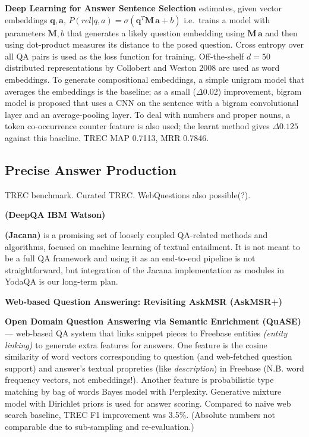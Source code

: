\textbf{Deep Learning for Answer Sentence Selection} \citep{Yu2014Deep}
	estimates, given vector embeddings $\mathbf{q}, \mathbf{a}$,
	$P(rel|q,a) = \sigma(\mathbf{q}^T \mathbf{M}\, \mathbf{a} + b)$
	i.e.\ trains a model with parameters $\mathbf{M}, b$ that
	generates a likely question embedding using $\mathbf{M}\, \mathbf{a}$
	and then using dot-product measures its distance to the posed question.
	Cross entropy over all QA pairs is used as the loss function for training.
	Off-the-shelf $d=50$ distributed representations by Collobert and Weston 2008
	are used as word embeddings.
	To generate compositional embeddings,
	a simple unigram model that averages the embeddings is the baseline;
	as a small ($\Delta 0.02$) improvement, bigram model is proposed that uses a CNN
	on the sentence with a bigram convolutional layer and an average-pooling layer.
	To deal with numbers and proper nouns, a token co-occurrence counter
	feature is also used; the learnt method gives $\Delta 0.125$ against this baseline.
	TREC MAP 0.7113, MRR 0.7846.

\subsection{Precise Answer Production}

TREC benchmark.  Curated TREC.  WebQuestions also possible(?).

\textbf{(DeepQA IBM Watson)} \citep{WatsonOverview}

\textbf{(Jacana)} \citep{TreeEdit2013Yao} \citep{TreeEditIR2013Yao}
is a promising set of loosely coupled QA-related methods
and algorithms, focused on machine learning of textual entailment.  It is
not meant to be a full QA framework and using it as an end-to-end pipeline
is not straightforward, but integration of the Jacana implementation as
modules in YodaQA is our long-term plan.

\textbf{Web-based Question Answering: Revisiting AskMSR (AskMSR+)}

\textbf{Open Domain Question Answering via Semantic Enrichment (QuASE)} \citep{QuASE}
	--- web-based QA system that links snippet pieces to Freebase entities
	\textit{(entity linking)} to generate extra features for answers.
	One feature is the cosine similarity of word
	vectors corresponding to question (and web-fetched question support)
	and answer's textual propreties (like \textit{description}) in Freebase
	(N.B. word frequency vectors, not embeddings!).
	Another feature is probabilistic type matching by bag of words Bayes model
	with Perplexity.  Generative mixture model with Dirichlet priors is used
	for answer scoring.  Compared to naive web search baseline, TREC F1
	improvement was 3.5\%.  (Absolute numbers not comparable due to
	sub-sampling and re-evaluation.)

